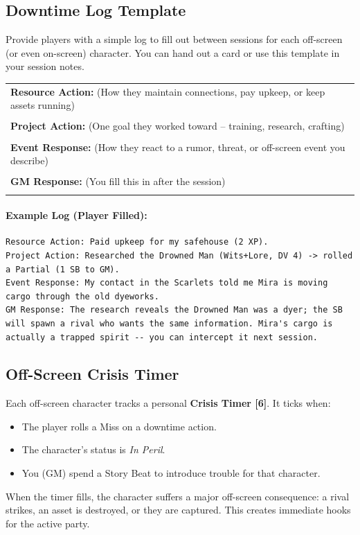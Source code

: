 \subsection{Downtime Log Template}
\label{sec:downtime-log}

Provide players with a simple log to fill out between sessions for each off-screen (or even on-screen) character. You can hand out a card or use this template in your session notes.

\begin{tcolorbox}[colback=gray!5!white, colframe=black, title=Downtime Log -- \_\_\_\_\_\_\_\_\_ (Character Name),breakable]
\begin{tabular}{p{}}
\textbf{Resource Action:} (How they maintain connections, pay upkeep, or keep assets running) \\
\rule{0pt}{4ex}\\
\textbf{Project Action:} (One goal they worked toward -- training, research, crafting) \\
\rule{0pt}{4ex}\\
\textbf{Event Response:} (How they react to a rumor, threat, or off-screen event you describe) \\
\rule{0pt}{4ex}\\
\textbf{GM Response:} (You fill this in after the session) \\
\rule{0pt}{4ex}
\end{tabular}
\end{tcolorbox}

\paragraph{Example Log (Player Filled):}
\begin{verbatim}
Resource Action: Paid upkeep for my safehouse (2 XP).
Project Action: Researched the Drowned Man (Wits+Lore, DV 4) -> rolled a Partial (1 SB to GM).
Event Response: My contact in the Scarlets told me Mira is moving cargo through the old dyeworks.
GM Response: The research reveals the Drowned Man was a dyer; the SB will spawn a rival who wants the same information. Mira's cargo is actually a trapped spirit -- you can intercept it next session.
\end{verbatim}

\subsection{Off-Screen Crisis Timer }
Each off-screen character tracks a personal \textbf{Crisis Timer [6]}. It ticks when:
\begin{itemize}
\item The player rolls a Miss on a downtime action.
\item The character's status is \textit{In Peril}.
\item You (GM) spend a Story Beat to introduce trouble for that character.
\end{itemize}
When the timer fills, the character suffers a major off-screen consequence: a rival strikes, an asset is destroyed, or they are captured. This creates immediate hooks for the active party.

